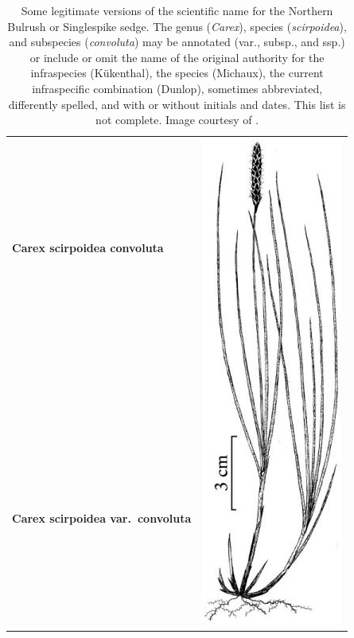 \documentclass{bmcart}
\begin{document}
\begin{table}[!htb]
  \begin{center}

  \caption{Some legitimate versions of the scientific name for the Northern
    Bulrush or Singlespike sedge. The genus (\textit{Carex}), species
    (\textit{scirpoidea}), and subspecies (\textit{convoluta}) may be annotated
    (var., subsp., and ssp.) or include or omit the name of the original
    authority for the infraspecies (Kükenthal), the species (Michaux), the
    current infraspecific combination (Dunlop), sometimes abbreviated,
    differently spelled, and with or without initials and dates. This list is
    not complete. Image courtesy of \cite{FNA2002}.}\label{table:carex}

    \begin{tabular}{| l | c |}
    \hline
    \textbf{Carex scirpoidea convoluta} &
    \multirow{26}{*}{\includegraphics[scale=0.3]{images/1.png}} \\
    & \\
    \textbf{Carex scirpoidea var.\ convoluta} & \\

\end{tabular}
\end{center}
\end{table}
\end{document}
